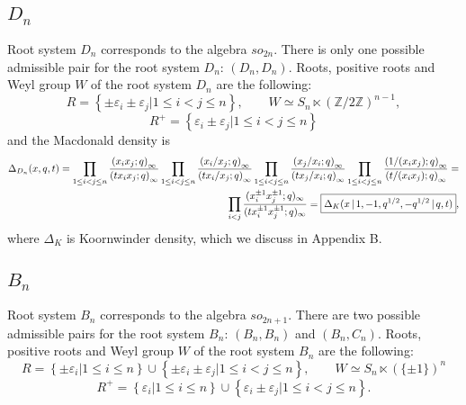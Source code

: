 \documentclass{article}
\def\nn{\nonumber}
\def\nn{\nonumber}
\def\ve{\varepsilon}
\begin{document}
\subsection*{$D_n$}
Root system $D_n$ corresponds to the algebra $so_{2n}$.
There is only one possible admissible pair for the root system $D_n$: $(D_n,D_n)$. Roots, positive roots and Weyl group $W$ of the root system $D_n$ are the following:
\begin{equation}
    R = \left\{\pm \ve_i\pm \ve_j| 1\leq i < j \leq n\right\}, \quad\quad W \simeq S_{n} \ltimes (\mathbb{Z}/2\mathbb{Z})^{n-1},\end{equation}
    \begin{equation}
    R^+ = \left\{ \ve_i\pm \ve_j| 1\leq i < j \leq n\right\}
    \end{equation}
and the Macdonald density is
\begin{align}
    \Delta_{D_n}(x,q,t) = \prod_{1\leq i < j \leq n} \frac{\left( x_i x_j;q\right)_{\infty}}{\left( t  x_i x_j  ;q\right)_{\infty}}
    \prod_{1\leq i < j \leq n} \frac{\left(x_i/x_j ;q\right)_{\infty}}{\left( t x_i/x_j  ;q\right)_{\infty}}
    \prod_{1\leq i < j \leq n} \frac{\left(x_j/x_i ;q\right)_{\infty}}{\left( t x_j/x_i  ;q\right)_{\infty}}
    \prod_{1\leq i < j \leq n} \frac{\left(1/(x_i x_j) ;q\right)_{\infty}}{\left( t/(x_i x_j)   ;q\right)_{\infty}}=\\
    \prod_{i<j}{(x_i^{\pm 1}x_j^{\pm 1};q)_{\infty}\over(tx_i^{\pm 1}x_j^{\pm 1};q)_{\infty}} \nn = \boxed{\Delta_K(x\,| \, 1,-1,q^{1/2},-q^{1/2} \,|\, q,t)},
\end{align}
where $\Delta_K$ is Koornwinder density, which we discuss in Appendix B.

\subsection*{$B_n$}
Root system $B_n$ corresponds to the algebra $so_{2n+1}$. There are two possible admissible pairs for the root system $B_n$: $(B_n,B_n)$ and $(B_n,C_n)$. Roots, positive roots and Weyl group $W$ of the root system $B_n$ are the following:
\begin{equation}
    R = \left\{\pm \ve_i | 1\leq i\leq n \right\} \cup \left\{\pm \ve_i\pm \ve_j| 1\leq i < j \leq n\right\}, \quad\quad W \simeq S_{n} \ltimes (\{\pm 1\})^n\end{equation}
\begin{equation}
    R^+ = \left\{\ve_i | 1\leq i\leq n \right\} \cup \left\{ \ve_i\pm \ve_j| 1\leq i < j \leq n\right\}.
    \end{equation}
\end{document}
